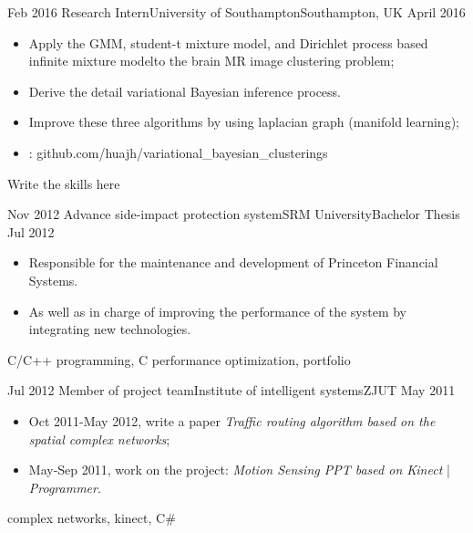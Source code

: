 \begin{experiences}
  \emptySeparator
  \experience
  {Feb 2016} {Research Intern}{University of Southampton}{Southampton, UK}
  {April 2016 }    {
				  	\begin{itemize}
				  		\item Apply the GMM, student-t mixture model, and Dirichlet process based infinite mixture modelto the brain MR image clustering problem; 
				  		\item Derive the detail variational Bayesian inference process.
				  		\item Improve these three algorithms by using laplacian graph (manifold learning); 				  	              
				  		\item \faGithub:  {github.com/huajh/variational\_bayesian\_clusterings}                                                                                    
				  	\end{itemize}
				  }
				  {Write the skills here  }
				  
  \emptySeparator
  \experience
  {Nov 2012} {Advance side-impact protection system}{SRM University}{Bachelor Thesis}
  {Jul 2012 }    {
  	\begin{itemize}
  		\item  Responsible for the maintenance and development of Princeton Financial Systems. 
  		\item As well as in charge of improving the performance of the system by integrating new technologies.
  	\end{itemize}
  }
  {C/C++ programming, C performance optimization, portfolio}
  	

  \emptySeparator
  \experience
  {Jul 2012} {Member of project team}{Institute of intelligent systems}{ZJUT}
  {May 2011 }    {
				  	\begin{itemize}
				  		\item  Oct 2011-May 2012, write a paper \emph{Traffic routing algorithm based on the spatial complex networks};
				  		\item  May-Sep 2011, work on the project: \emph{Motion Sensing PPT based on Kinect} | \emph{Programmer}.
				  	\end{itemize}
				  }
				  {complex networks, kinect, C\#}
	  				  

\end{experiences}
